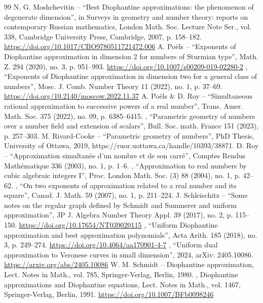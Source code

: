 \documentclass[10pt,a4paper]{amsart}
\numberwithin{equation}{section}
\theoremstyle{definition}
\theoremstyle{plain}
\begin{document}
\begin{thebibliography}{99}
 N. G. Moshchevitin – “Best Diophantine approximations: the phenomenon of degenerate dimension”, in Surveys in geometry and number theory: reports on contemporary Russian mathematics, London Math. Soc. Lecture Note Ser., vol. 338, Cambridge University Press, Cambridge, 2007, p. 158–182. \url{https://doi.org/10.1017/CBO9780511721472.006}
 A. Poëls – “Exponents of Diophantine approximation in dimension 2 for numbers of Sturmian type”, Math. Z. 294 (2020), no. 3, p. 951–993. \url{https://doi.org/10.1007/s00209-019-02280-2}
 \textemdash{}, “Exponents of Diophantine approximation in dimension two for a general class of numbers”, Mosc. J. Comb. Number Theory 11 (2022), no. 1, p. 37–69. \url{https://doi.org/10.2140/moscow.2022.11.37}
 A. Poëls \& D. Roy – “Simultaneous rational approximation to successive powers of a real number”, Trans. Amer. Math. Soc. 375 (2022), no. 09, p. 6385–6415. 
 \textemdash{}, “Parametric geometry of numbers over a number field and extension of scalars”, Bull. Soc. math. France 151 (2023), p. 257–303. 
 M. Rivard-Cooke – “Parametric geometry of numbers”, PhD Thesis, University of Ottawa, 2019, https://ruor.uottawa.ca/handle/10393/38871. 
 D. Roy – “Approximation simultanée d’un nombre et de son carré”, Comptes Rendus Mathématique 336 (2003), no. 1, p. 1–6. 
 \textemdash{}, “Approximation to real numbers by cubic algebraic integers I”, Proc. London Math. Soc. (3) 88 (2004), no. 1, p. 42–62. 
 \textemdash{}, “On two exponents of approximation related to a real number and its square”, Canad. J. Math. 59 (2007), no. 1, p. 211–224. 
 J. Schleischitz – “Some notes on the regular graph defined by Schmidt and Summerer and uniform approximation”, JP J. Algebra Number Theory Appl. 39 (2017), no. 2, p. 115–150. \url{https://doi.org/10.17654/NT039020115}
 \textemdash{}, “Uniform Diophantine approximation and best approximation polynomials”, Acta Arith. 185 (2018), no. 3, p. 249–274. \url{https://doi.org/10.4064/aa170901-4-7}
 \textemdash{}, “Uniform dual approximation to Veronese curves in small dimension”, 2024, arXiv: 2405.10086. \url{https://arxiv.org/abs/2405.10086}
 W. M. Schmidt – Diophantine approximation, Lect. Notes in Math., vol. 785, Springer-Verlag, Berlin, 1980. 
 \textemdash{}, Diophantine approximations and Diophantine equations, Lect. Notes in Math., vol. 1467, Springer-Verlag, Berlin, 1991. \url{https://doi.org/10.1007/BFb0098246}
\end{thebibliography}
\end{document}
